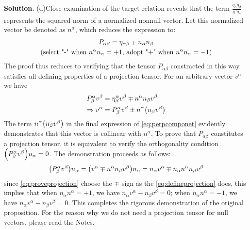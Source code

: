 \documentclass[12pt, a4paper, oneside]{article}
\newenvironment{solution}{\par\noindent\textbf{Solution. }}{\par}
\begin{document}
\begin{solution}
    (d)Close examination of the target relation reveals that the term $\frac{q_\alpha q_\beta}{q^\gamma q_\gamma}$ represents the squared norm of a normalized nonnull vector. Let this normalized vector be denoted as $n^\alpha$, which reduces the expression to:
    \begin{gather}
        P_{\alpha\beta}=\eta_{\alpha\beta} \mp n_\alpha n_\beta\label{eq:defineprojection}\\
        \qty(\text{select "-" when }n^\alpha n_\alpha = +1\text{, adopt "+" when }n^\alpha n_\alpha = -1)\nonumber
    \end{gather}
    The proof thus reduces to verifying that the tensor $P_{\alpha\beta}$ constracted in this way satisfies all defining properties of a projection tensor. For an arbitrary vector $v^\alpha$ we have
    \begin{align}
        P^\alpha_\beta v^\beta &= \eta^\alpha_\beta v^\beta \mp n^\alpha n_\beta v^\beta\\
        \Rightarrow v^\alpha &= P^\alpha_\beta v^\beta \pm n^\alpha\qty(n_\beta v^\beta)\label{eq:perpcomponet}
    \end{align}
    The term $n^\alpha\qty(n_\beta v^\beta)$ in the final expression of \cref{eq:perpcomponet} evidently demonstrates that this vector is collinear with $n^\alpha$. To prove that $P_{\alpha\beta}$ constitutes a projection tensor, it is equivalent to verify the orthogonality condition $\qty(P^\alpha_\beta v^\beta)n_\alpha = 0$. The demonstration proceeds as follows:
    \begin{equation}
        \qty(P^\alpha_\beta v^\beta)n_\alpha = \qty(v^\alpha \mp n^\alpha n_\beta v^\beta)n_\alpha = n_\alpha v^\alpha \mp n_\alpha n^\alpha n_\beta v^\beta\label{eq:proveprojection}
    \end{equation}
    since \cref{eq:proveprojection} choose the $\mp$ sign as the \cref{eq:defineprojection} does, this implies that when $n_\alpha n^\alpha = +1$, we have $n_\alpha v^\alpha - n_\beta v^\beta = 0$; when $n_\alpha n^\alpha = -1$, we have $n_\alpha v^\alpha - n_\beta v^\beta = 0$. This completes the rigorous demonstration of the original proposition. For the reason why we do not need a projection tensor for null vectors, please read the Notes.
\end{solution}
\end{document}
